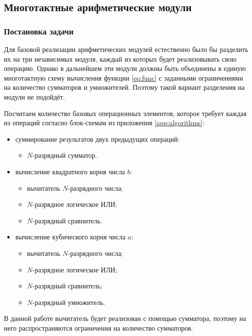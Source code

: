 \subsection{Многотактные арифметические модули}
\label{sec:multi_cycle_modules}

\subsubsection{Постановка задачи}

Для базовой реализации арифметических модулей естественно было бы разделить их на три независимых модуля, каждый из которых будет реализовывать свою операцию. Однако в дальнейшем эти модули должны быть объединены в единую многотактную схему вычисления функции \eqref{eq:func} с заданными ограничениями на количество сумматоров и умножителей. Поэтому такой вариант разделения на модули не подойдёт.

Посчитаем количество базовых операционных элементов, которое требует каждая из операций согласно блок-схемам из приложения \ref{app:algorithms}:
\begin{itemize}
    \item суммирование результатов двух предыдущих операций:
    \begin{itemize}
        \item $N$-разрядный сумматор.
    \end{itemize}
    \item вычисление квадратного корня числа $b$:
    \begin{itemize}
        \item вычитатель $N$-разрядного числа;
        \item $N$-разрядное логическое ИЛИ;
        \item $N$-разрядный сравнитель.
    \end{itemize}
    \item вычисление кубического корня числа $a$:
    \begin{itemize}
        \item вычитатель $N$-разрядного числа;
        \item $N$-разрядное логическое ИЛИ;
        \item $N$-разрядный сравнитель;
        \item $N$-разрядный умножитель.
    \end{itemize}
\end{itemize}

В данной работе вычитатель будет реализован с помощью сумматора, поэтому на него распространяются ограничения на количество сумматоров.

